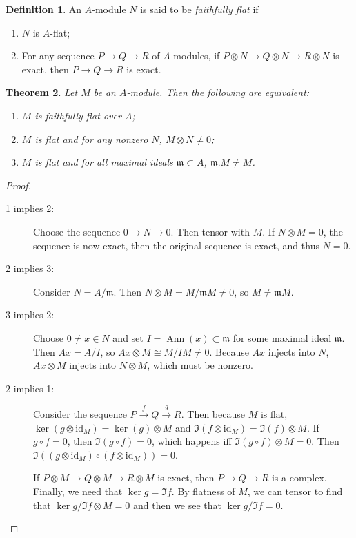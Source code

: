 \documentclass[leqno, openany]{memoir}
\newtheorem{thm}{Theorem}[section]
\theoremstyle{definition}
\newtheorem{defn}[thm]{Definition}
\theoremstyle{remark}
\theoremstyle{plain}
\theoremstyle{definition}
\theoremstyle{remark}
\newcommand{\mf}[1]{\mathfrak{#1}}
\newcommand{\mr}[1]{\mathrm{#1}}
\begin{document}
\begin{defn} An $A$-module $N$ is said to be \textit{faithfully flat} if
    \begin{enumerate} \item $N$ is $A$-flat; \item For any sequence $P \to Q
        \to R$ of $A$-modules, if $P \otimes N \to Q \otimes N \to R \otimes N$
        is exact, then $P \to Q \to R$ is exact.  \end{enumerate} \end{defn}

\begin{thm} Let $M$ be an $A$-module. Then the following are equivalent:
    \begin{enumerate} \item $M$ is faithfully flat over $A$; \item $M$ is flat
        and for any nonzero $N$, $M \otimes N \neq 0$; \item $M$ is flat and
        for all maximal ideals $\mf{m} \subset A$, $\mf{m} . M \neq M$.
\end{enumerate} \end{thm}

\begin{proof} \begin{description} \item[1 implies 2:] Choose the sequence $0
    \to N \to 0$. Then tensor with  $M$. If $N \otimes M = 0$, the sequence is
    now exact, then the original sequence is exact, and thus $N = 0$.  \item[2
    implies 3:] Consider $N = A/\mf{m}$. Then $N \otimes M = M / \mf{m}M \neq
    0$, so $M \neq \mf{m}M$.  \item[3 implies 2:] Choose $0 \neq x \in N$ and
    set $I = \operatorname{Ann}(x) \subset \mf{m}$ for some maximal ideal
    $\mf{m}$. Then $Ax = A/I$, so $Ax \otimes M \cong M / IM \neq 0$. Because
    $Ax$ injects into $N$, $Ax \otimes M$ injects into $N \otimes M$, which
    must be nonzero.  \item[2 implies 1:] Consider the sequence $P
    \xrightarrow{f} Q \xrightarrow{g} R$. Then because $M$ is flat, $\ker(g
    \otimes \mr{id}_M) = \ker(g) \otimes M$ and $\Im(f \otimes \mr{id}_M) =
    \Im(f) \otimes M$. If $g \circ f = 0$, then $\Im(g \circ f) = 0$, which
    happens iff $\Im(g \circ f) \otimes M = 0$. Then $\Im((g \otimes \mr{id}_M)
    \circ (f \otimes \mr{id}_M)) = 0$. 
            
            If $P \otimes M \to Q \otimes M \to R \otimes M$ is exact, then $P
    \to Q \to R$ is a complex. Finally, we need that $\ker g = \Im f$. By
    flatness of $M$, we can tensor to find that $\ker g / \Im f \otimes M = 0$
    and then we see that $\ker g / \Im f = 0$. \qedhere \end{description}
\end{proof}
\end{document}
